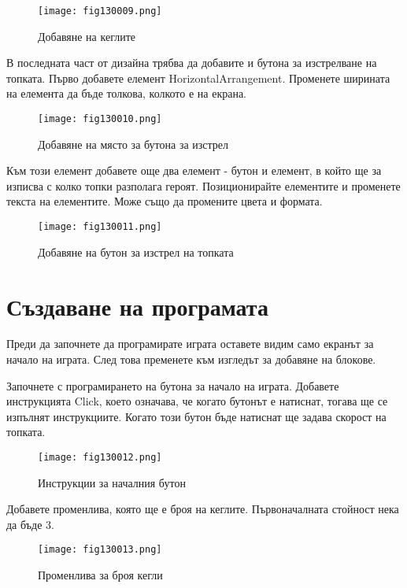 \begin{figure}[H]
  \centering
  \texttt{[image: fig130009.png]}
  \caption{Добавяне на кеглите}
\label{fig130009}
\end{figure}

В последната част от дизайна трябва да добавите и бутона за изстрелване на топката. Първо добавете елемент HorizontalArrangement. Променете ширината на елемента да бъде толкова, колкото е на екрана.

\begin{figure}[H]
  \centering
  \texttt{[image: fig130010.png]}
  \caption{Добавяне на място за бутона за изстрел}
\label{fig130010}
\end{figure}

Към този елемент добавете още два елемент - бутон и елемент, в който ще за изписва с колко топки разполага героят. Позиционирайте елементите и променете текста на елементите. Може също да промените цвета и формата.

\begin{figure}[H]
  \centering
  \texttt{[image: fig130011.png]}
  \caption{Добавяне на бутон за изстрел на топката}
\label{fig130011}
\end{figure}

\section{Създаване на програмата}

Преди да започнете да програмирате играта оставете видим само екранът за начало на играта. След това пременете към изгледът за добавяне на блокове.

Започнете с програмирането на бутона за начало на играта. Добавете инструкцията Click, което означава, че когато бутонът е натиснат, тогава ще се изпълнят инструкциите. Когато този бутон бъде натиснат ще задава скорост на топката.

\begin{figure}[H]
  \centering
  \texttt{[image: fig130012.png]}
  \caption{Инструкции за началния бутон}
\label{fig130012}
\end{figure}

Добавете променлива, която ще е броя на кеглите. Първоначалната стойност нека да бъде 3.

\begin{figure}[H]
  \centering
  \texttt{[image: fig130013.png]}
  \caption{Променлива за броя кегли}
\label{fig130013}
\end{figure}

